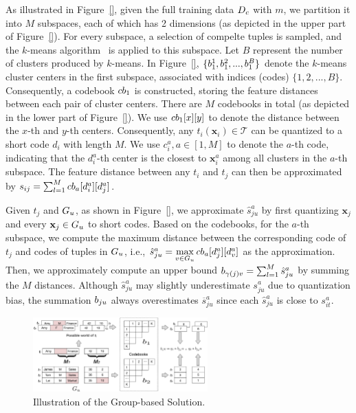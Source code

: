 As illustrated in Figure~\ref{}, given the full training data $D_c$ with $m$, we partition it into $M$ subspaces, each of which has 2 dimensions (as depicted in the upper part of Figure~\ref{}). For every subspace, a selection of compelte tuples is sampled, and the $k$-means algorithm~\cite{} is applied to this subspace. Let $B$ represent the number of clusters produced by $k$-means. In Figure~\ref{}, $\{b_1^1, b_1^2,..., b_1^B\}$ denote the $k$-means cluster centers in the first subspace, associated with indices (codes) $\{1, 2,...,B\}$. Consequently, a codebook $cb_1$ is constructed, storing the feature distances between each pair of cluster centers. There are $M$ codebooks in total (as depicted in the lower part of Figure~\ref{}). We use $cb_1[x][y]$ to denote the distance between the $x$-th and $y$-th centers. Consequently, any $t_i (\mathbf{x}_i) \in \mathcal{T}$ can be quantized to a short code $d_i$ with length $M$. We use $c_i^a, a\in[1,M]$ to denote the $a$-th code, indicating that the $d_i^a$-th center is the closest to $\mathbf{x}_i^a$ among all clusters in the $a$-th subspace. The feature distance between any $t_i$ and $t_j$ can then be approximated by $s_{ij}=\sum_{l=1}^{M}cb_a[d_i^a][d_j^a]$.

Given $t_{j}$ and $G_u$, as shown in Figure~\ref{}, we approximate $\hat{s}_{ju}^a$ by first quantizing $\mathbf{x}_{j}$ and every $\mathbf{x}_{j} \in G_u$ to short codes. Based on the codebooks, for the $a$-th subspace, we compute the maximum distance between the corresponding code of $t_{j}$ and codes of tuples in $G_u$, i.e., $\hat{s}_{ju}^a = \max\limits_{v\in G_u}cb_a[d_{j}^a][d_v^a]$ as the approximation. Then, we approximately compute an upper bound $b_{\gamma(j)v}=\sum_{l=1}^{M}\hat{s}_{ju}^a$ by summing the $M$ distances. Although $\hat{s}_{ju}^a$ may slightly underestimate $s^a_{ju}$ due to quantization bias, the summation $b_{ju}$ always overestimates $\overline{s}^a_{ju}$ since each $\hat{s}_{ju}^a$ is close to $s^a_{it}$.

\begin{figure}[t]
    \centering
    \includegraphics[width=0.6\textwidth]{figs/distance}
    \caption{Illustration of the Group-based Solution.}
    \label{fig:distance}
\end{figure}

